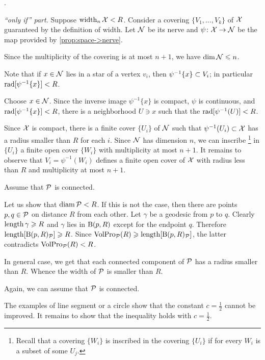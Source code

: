  \cite[Appendix 1(E$_{2}$)]{gromov-1983}.

\parbf{\ref{ex:width=suprad(inv)},} \textit{``only if'' part.}
Suppose $\operatorname{\rm width}\nolimits_n\mathcal{X}<R$.
Consider a covering $\{V_1,\dots,V_k\}$ of $\mathcal{X}$ guaranteed by the definition of width.
Let $\mathcal{N}$ be its nerve and $\psi\colon\mathcal{X}\to \mathcal{N}$ be the map provided by \ref{prop:space->nerve}.

Since the multiplicity of the covering is at most $n+1$, we have $\operatorname{\rm dim}\nolimits \mathcal{N}\leqslant n$.

Note that if $x\in \mathcal{N}$ lies in a star of a vertex $v_i$,
then $\psi^{-1}\{x\}\z\subset V_i$;
in particular $\mathop{\rm rad}\nolimits[\psi^{-1}\{x\}]<R$.

Choose $x\in \mathcal{N}$.
Since the inverse image $\psi^{-1}\{x\}$ is compact, $\psi$ is continuous, and $\mathop{\rm rad}\nolimits[\psi^{-1}\{x\}]<R$,
there is a neighborhood $U\ni x$ such that the  $\mathop{\rm rad}\nolimits[\psi^{-1}(U)]<R$.

Since $\mathcal{X}$ is compact,  there is a finite cover $\{U_i\}$ of $\mathcal{N}$ such that $\psi^{-1}(U_i)\subset\mathcal{X}$ has a radius smaller than $R$ for each $i$.
Since $\mathcal{N}$ has dimension $n$, we can inscribe%
\footnote{Recall that a covering $\{W_i\}$ is inscribed in the covering $\{U_i\}$ if for every $W_i$ is a subset of some $U_j$.} 
in $\{U_i\}$ a finite open cover $\{W_i\}$ with multiplicity at most $n+1$.
It remains to observe that $V_i=\psi^{-1}(W_i)$ defines a finite open cover of $\mathcal{X}$ with radius less than $R$ and multiplicity at most $n+1$. 


Assume that $\mathcal{P}$ is connected.

Let us show that $\operatorname{\rm diam}\nolimits\mathcal{P}<R$.
If this is not the case, then there are points $p,q\in\mathcal{P}$ on distance $R$ from each other.
Let $\gamma$ be a geodesic from $p$ to $q$.
Clearly $\mathop{\rm length}\nolimits\gamma\geqslant R$ and $\gamma$ lies in $\mathrm{B}{}(p,R)$ except for the endpoint $q$.
Therefore $\mathop{\rm length}\nolimits[\mathrm{B}{}(p,R)_{\mathcal{P}}]\geqslant R$.
Since $\VolPro_{\spc{P}}(R)\z\ge \length[\oBall(p,R)_{\spc{P}}]$,
the latter contradicts $\operatorname{\rm VolPro}\nolimits_{\mathcal{P}}(R)<R$.

In general case, we get that each connected component of $\mathcal{P}$ has a radius smaller than $R$.
Whence the width of $\mathcal{P}$ is smaller than $R$.

 Again, we can assume that $\mathcal{P}$ is connected.

The examples of line segment or a circle show that the constant $c=\tfrac12$ cannot be improved.
It remains to show that the inequality holds with $c=\tfrac12$.

